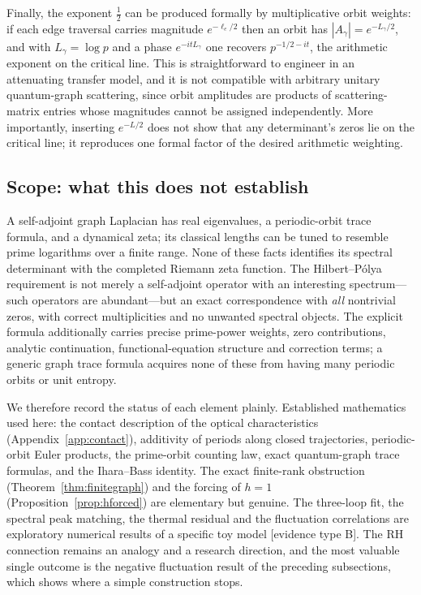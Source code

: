 \documentclass[11pt]{article}
\begin{document}
Finally, the exponent $\tfrac12$ can be produced formally by multiplicative orbit weights:
if each edge traversal carries magnitude $e^{-\ell_e/2}$ then an orbit has
$|A_\gamma|=e^{-L_\gamma/2}$, and with $L_\gamma=\log p$ and a phase $e^{-itL_\gamma}$ one
recovers $p^{-1/2-it}$, the arithmetic exponent on the critical line. This is
straightforward to engineer in an attenuating transfer model, and it is not compatible with
arbitrary unitary quantum-graph scattering, since orbit amplitudes are products of
scattering-matrix entries whose magnitudes cannot be assigned independently. More
importantly, inserting $e^{-L/2}$ does not show that any determinant's zeros lie on the
critical line; it reproduces one formal factor of the desired arithmetic weighting.

\subsection{Scope: what this does not establish}

A self-adjoint graph Laplacian has real eigenvalues, a periodic-orbit trace formula, and a
dynamical zeta; its classical lengths can be tuned to resemble prime logarithms over a
finite range. None of these facts identifies its spectral determinant with the completed
Riemann zeta function. The Hilbert--P\'olya requirement is not merely a self-adjoint
operator with an interesting spectrum---such operators are abundant---but an exact
correspondence with \emph{all} nontrivial zeros, with correct multiplicities and no
unwanted spectral objects. The explicit formula additionally carries precise prime-power
weights, zero contributions, analytic continuation, functional-equation structure and
correction terms; a generic graph trace formula acquires none of these from having many
periodic orbits or unit entropy.

We therefore record the status of each element plainly. Established mathematics used here:
the contact description of the optical characteristics (Appendix~\ref{app:contact}),
additivity of periods along closed trajectories, periodic-orbit Euler products, the
prime-orbit counting law, exact quantum-graph trace formulas, and the Ihara--Bass identity.
The exact finite-rank obstruction (Theorem~\ref{thm:finitegraph}) and the forcing of
$h=1$ (Proposition~\ref{prop:hforced}) are elementary but genuine. The three-loop fit, the
spectral peak matching, the thermal residual and the fluctuation correlations are
exploratory numerical results of a specific toy model [evidence type B]. The RH connection
remains an analogy and a research direction, and the most valuable single outcome is the
negative fluctuation result of the preceding subsections, which shows where a simple
construction stops.
\end{document}
